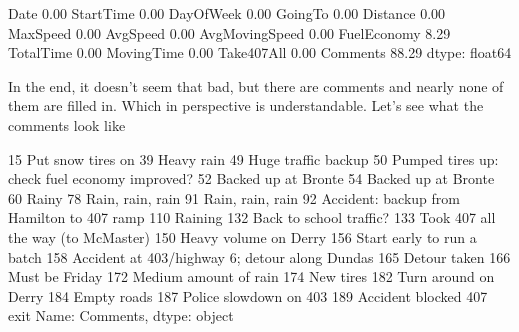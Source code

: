 \documentclass[letterpaper,10pt,english]{jupyterBook}
\begin{document}
\begin{sphinxVerbatim}[commandchars=\\\{\}]
Date               0.00
StartTime          0.00
DayOfWeek          0.00
GoingTo            0.00
Distance           0.00
MaxSpeed           0.00
AvgSpeed           0.00
AvgMovingSpeed     0.00
FuelEconomy        8.29
TotalTime          0.00
MovingTime         0.00
Take407All         0.00
Comments          88.29
dtype: float64
\end{sphinxVerbatim}

\sphinxAtStartPar
In the end, it doesn’t seem that bad, but there are comments and nearly none of them are filled in. Which in perspective is understandable. Let’s see what the comments look like

\begin{sphinxVerbatim}[commandchars=\\\{\}]
\PYG{p}{[}\PYG{p}{]}
\end{sphinxVerbatim}

\begin{sphinxVerbatim}[commandchars=\\\{\}]
15                                  Put snow tires on
39                                         Heavy rain
49                                Huge traffic backup
50      Pumped tires up: check fuel economy improved?
52                                Backed up at Bronte
54                                Backed up at Bronte
60                                              Rainy
78                                   Rain, rain, rain
91                                   Rain, rain, rain
92         Accident: backup from Hamilton to 407 ramp
110                                           Raining
132                           Back to school traffic?
133                Took 407 all the way (to McMaster)
150                             Heavy volume on Derry
156                        Start early to run a batch
158    Accident at 403/highway 6; detour along Dundas
165                                      Detour taken
166                                    Must be Friday
172                             Medium amount of rain
174                                         New tires
182                              Turn around on Derry
184                                       Empty roads
187                            Police slowdown on 403
189                         Accident blocked 407 exit
Name: Comments, dtype: object
\end{sphinxVerbatim}
\end{document}
